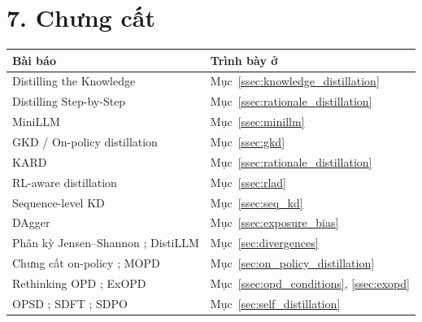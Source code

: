 \section*{7. Chưng cất}
\begin{longtable}{@{}p{7.2cm}p{7.6cm}@{}}
\toprule
\textbf{Bài báo} & \textbf{Trình bày ở} \\
\midrule
\endhead
Distilling the Knowledge \cite{hinton2015distilling} & Mục~\ref{ssec:knowledge_distillation} \\
Distilling Step-by-Step \cite{hsieh2023distilling} & Mục~\ref{ssec:rationale_distillation} \\
MiniLLM \cite{gu2024minillm} & Mục~\ref{ssec:minillm} \\
GKD / On-policy distillation \cite{agarwal2024gkd} & Mục~\ref{ssec:gkd} \\
KARD \cite{kang2023kard} & Mục~\ref{ssec:rationale_distillation} \\
RL-aware distillation \cite{zhang2026rlad} & Mục~\ref{ssec:rlad} \\
Sequence-level KD \cite{kim2016sequence} & Mục~\ref{ssec:seq_kd} \\
DAgger \cite{ross2011dagger} & Mục~\ref{ssec:exposure_bias} \\
Phân kỳ Jensen--Shannon \cite{lin1991divergence}; DistiLLM \cite{ko2024distillm} & Mục~\ref{sec:divergences} \\
Chưng cất on-policy \cite{lu2025opd}; MOPD \cite{ma2026mopd} & Mục~\ref{sec:on_policy_distillation} \\
Rethinking OPD \cite{li2026rethinkingopd}; ExOPD \cite{yang2026exopd} & Mục~\ref{ssec:opd_conditions}, \ref{ssec:exopd} \\
OPSD \cite{zhao2026opsd}; SDFT \cite{shenfeld2026sdft}; SDPO \cite{huebotter2026sdpo} & Mục~\ref{sec:self_distillation} \\
\bottomrule
\end{longtable}

